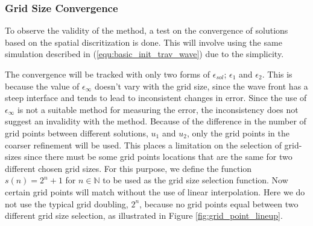 \subsubsection{Grid Size Convergence}
  To observe the validity of the method, a test on the convergence of solutions based on the spatial discritization is done.
  This will involve using the same simulation described in (\ref{equ:basic_init_trav_wave}) due to the simplicity. 
 
  The convergence will be tracked with only two forms of $\epsilon_{sol}$; $\epsilon_1$ and $\epsilon_2$.
  This is because the value of $\epsilon_{\infty}$ doesn't vary with the grid size, since the wave front has a steep interface and tends to lead to inconsistent changes in error.
  Since the use of $\epsilon_{\infty}$ is not a suitable method for measuring the error, the inconsistency does not suggest an invalidity with the method.
  Because of the difference in the number of grid points between different solutions, $u_1$ and $u_2$, only the grid points in the coarser refinement will be used.
  This places a limitation on the selection of grid-sizes since there must be some grid points locations that are the same for two different chosen grid sizes.
  For this purpose, we define the function $s(n) = 2^{n}+1$ for $n \in \mathbb{N}$ to be used as the grid size selection function.
  Now certain grid points will match without the use of linear interpolation.
  Here we do not use the typical grid doubling, $2^n$, because no grid points equal between two different grid size selection, as illustrated in Figure \ref{fig:grid_point_lineup}.

